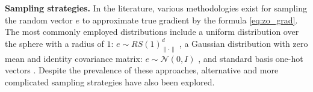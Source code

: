 \documentclass{article}
\theoremstyle{plain}
\theoremstyle{definition}
\theoremstyle{remark}
\begin{document}


\textbf{Sampling strategies.} In the literature, various methodologies exist for sampling the random vector $e$ to approximate true gradient by the formula \eqref{eq:zo_grad}. The most commonly employed distributions include a uniform distribution over the sphere with a radius of $1$: $e \sim RS(1)^d_{\| \cdot \|}$ \cite{flaxman2005online,nesterov2017random}, a Gaussian distribution with zero mean and identity covariance matrix: $e \sim \mathcal{N}(0, I)$ \cite{nesterov2017random,ghadimi2013stochastic}, and standard basis one-hot vectors \cite{duchi2015optimal,shamir2013complexity}. Despite the prevalence of these approaches, alternative and more complicated sampling strategies have also been explored.
\end{document}
